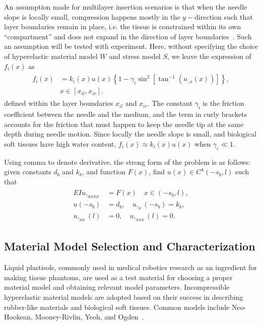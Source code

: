 An assumption made for multilayer insertion scenarios is that when the needle slope is locally small, compression happens mostly in the $y-$direction such that layer boundaries remain in place, i.e. the tissue is constrained within its own ``compartment'' and does not expand in the direction of layer boundaries~\parencite{glozmanImageGuidedRoboticFlexible2007}. Such an assumption will be tested with experiment. Here, without specifying the choice of hyperelastic material model $W$ and stress model $S$, we leave the expression of $f_i(x)$ as
\begin{align}
  \label{eq:chap-3-fx-general}
  \begin{split}
    f_i(x) &= k_i(x)u(x)\left\{ 1 - \gamma_i\sin^2\left[ \tan^{-1}\left( u_{,x}(x) \right) \right] \right\}, \\
           & x \in [x_{il}, x_{ir}].
  \end{split}
\end{align}
defined within the layer boundaries $x_{il}$ and $x_{ir}$. The constant $\gamma_i$ is the friction coefficient between the needle and the medium, and the term in curly brackets accounts for the friction that must happen to keep the needle tip at the same depth during needle motion. Since locally the needle slope is small, and biological soft tissues have high water content, $f_i(x)\approx k_i(x)u(x)$ when $\gamma_i \ll 1$.

Using comma to denote derivative, the strong form of the problem is as follows: given constants $d_b$ and $k_b$, and function $F(x)$, find $u(x) \in C^4\left(-s_b, l\right)$ such that
\begin{align}
  \label{eq:chap-3-complete-formulation}
  \begin{split}
    EIu,_{xxxx} &= F(x) \quad x\in \left(-s_b, l\right), \\
    u(-s_b) &= d_b, \quad u,_{x}(-s_b) = k_b, \\
    u,_{xx}(l) &= 0, \quad u,_{xxx}(l) = 0.     
  \end{split}
\end{align}

\subsection{Material Model Selection and Characterization}
\label{sec:chap-3-material-model-selection-and-characterization}

Liquid plastisols, commonly used in medical robotics research as an ingredient for making tissue phantoms, are used as a test material for choosing a proper material model and obtaining relevant model parameters. Incompressible hyperelastic material models are adopted based on their success in describing rubber-like materials and biological soft tissues. Common models include Neo-Hookean, Mooney-Rivlin, Yeoh, and Ogden~\parencite{martinsComparativeStudySeveral2006,singhMechanicalPropertiesWholebody2021,heComparativeStudy852022}.

